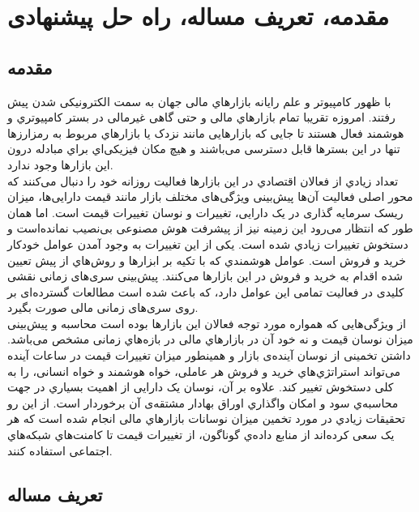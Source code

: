 \chapter{مقدمه، تعریف مساله، راه‌ حل پیشنهادی}
\section{مقدمه}
 با ظهور کامپیوتر و علم رایانه بازارهاي مالی  جهان به سمت الکترونیکی شدن پیش رفتند. امروزه تقریبا تمام بازارهاي مالی و
حتی گاهی غیرمالی در بستر کامپیوتري و هوشمند فعال هستند تا جایی که بازارهایی مانند نزدک یا بازارهاي مربوط به  رمزارزها تنها در این بسترها قابل دسترسی می‌باشند و هیچ مکان فیزیکی‌اي براي مبادله درون این بازارها وجود ندارد.\\
تعداد زیادي از فعالان اقتصادي در این بازارها فعالیت روزانه خود را دنبال می‌کنند که محور اصلی فعالیت آن‌ها پیش‌بینی ویژگی‌های مختلف بازار مانند قیمت دارایی‌ها، میزان ریسک سرمایه گذاری در یک دارایی، تغییرات و نوسان تغییرات قیمت است. اما همان طور که انتظار می‌رود این زمینه نیز از پیشرفت هوش مصنوعی بی‌نصیب نمانده‌است و دستخوش تغییرات زیادي شده است. یکی از این تغییرات به وجود آمدن عوامل خودکار خرید و فروش است. عوامل هوشمندي که با تکیه بر ابزارها و روش‌هاي از پیش تعیین شده اقدام به خرید و فروش در این بازارها می‌کنند. پیش‌بینی سری‌های زمانی نقشی کلیدی در فعالیت تمامی این عوامل دارد، که باعث شده است مطالعات گسترده‌ای بر روی سری‌های زمانی مالی صورت بگیرد.\\
از ویژگی‌هایی که همواره مورد توجه فعالان این بازارها بوده است محاسبه و پیش‌بینی میزان نوسان قیمت و نه خود آن در بازارهاي مالی در بازه‌هاي زمانی مشخص می‌باشد. داشتن تخمینی از نوسان آینده‌ی بازار و همینطور میزان تغییرات قیمت در ساعات آینده می‌تواند استراتژي‌هاي خرید و فروش هر عاملی، خواه هوشمند و خواه انسانی، را به کلی دستخوش تغییر کند. علاوه بر آن، نوسان یک دارایی از اهمیت بسیاري در جهت محاسبه‌ي سود و امکان واگذاري اوراق بهادار مشتقه‌ی آن برخوردار است. از این رو تحقیقات زیادي در مورد تخمین میزان نوسانات بازارهاي مالی انجام شده است که هر یک سعی کرده‌اند از منابع داده‌ي گوناگون، از تغییرات قیمت تا کامنت‌هاي شبکه‌هاي اجتماعی استفاده کنند.
\section{تعریف مساله}
